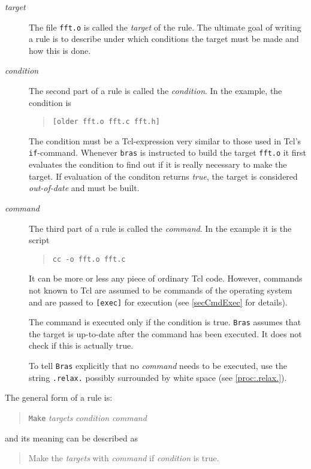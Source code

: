 \documentclass[11pt,bibtotoc,idxtotoc]{scrreprt}
\makeatletter
\newcommand{\bras}{\texttt{bras}}
\newcommand{\Bras}{\texttt{Bras}}
\newcommand{\Index}[1]{#1\index{#1}}
\newcommand{\Indextt}[1]{\texttt{#1}\index{#1@\texttt{#1}}}
\makeatother
\begin{document}
\begin{description}
\item[\textit{target}] The file \texttt{fft.o} is called the
  \textit{target} of the rule. The ultimate goal of writing a rule is
  to describe under which conditions the target must be made and how
  this is done. 
\item[\textit{condition}] The second part of a rule
  is called the \textit{condition}. In the example, the condition is
  \begin{quote}
  \texttt{[older fft.o {fft.c fft.h}]}
  \end{quote}
  The condition must be a Tcl-expression very similar to
  those used in Tcl's \texttt{if}-command. Whenever \bras{} is
  instructed to build the target \texttt{fft.o} it first evaluates the
  condition to find out if it is really necessary to make the
  target. If evaluation of the conditon returns \textit{true}, the
  target is considered \textit{out-of-date} and must be built.
\item[\textit{command}] The third part of a rule is
  called the \textit{command}. In the example it is the script
  \begin{quote}
    \texttt{cc -o fft.o fft.c}
  \end{quote}
  It can be more or less any piece of ordinary Tcl code. However,
  commands not known to Tcl are assumed to be commands of the
  operating system and are passed to \texttt{[exec]} for execution
  (see \ref{secCmdExec} for details).
  
  The command is executed only if the condition is true. \Bras{}
  assumes that the target is up-to-date after the command has been
  executed. It does not check if this is actually true.
  
  To tell \Bras{} explicitly that no \textit{command} needs to be
  executed, use the string \Indextt{.relax.} possibly surrounded by
  white space (see \ref{proc:.relax.}).
\end{description}

The general form of a \Index{rule} is:
\begin{quote}
  \texttt{Make} \textit{targets} \textit{condition} \textit{command}
\end{quote}
and its meaning can be described as
\begin{quote}
  Make the \textit{targets} with \textit{command} if
  \textit{condition} is true.
\end{quote}
\end{document}
